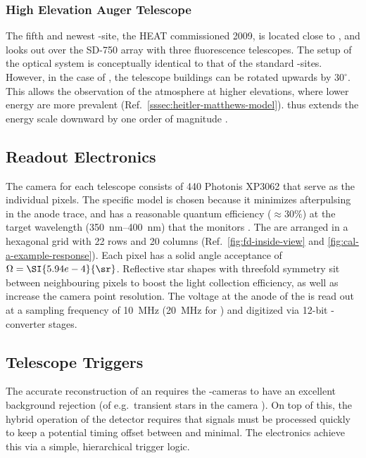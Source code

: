 \subsubsection{High Elevation Auger Telescope}
\label{sssec:HEAT}

The fifth and newest \FD-site, the \acl{HEAT} commissioned 2009, is located 
close to \CO, and looks out over the SD-750 array with three fluorescence 
telescopes. The setup of the optical system is conceptually identical to that
of the standard \FD-sites. However, in the case of \HEAT, the telescope 
buildings can be rotated upwards by $30^\circ$. This allows the observation of 
the atmosphere at higher elevations, where lower energy \EASs are more 
prevalent (Ref.\ \cref{sssec:heitler-matthews-model}). \HEAT thus extends the 
\FD energy scale downward by one order of magnitude 
\cite{mathesHEATTelescopesPierre2011}.

\subsection{Readout Electronics}
\label{ssec:fd-camera}

The camera for each telescope consists of 440 Photonis XP3062 \PMTs that serve 
as the individual pixels. The specific model is chosen because it minimizes 
afterpulsing in the anode trace, and has a reasonable quantum efficiency 
($\approx30\%$) at the target wavelength (\SIrange{350}{400}{\nano\meter}) that 
the \FD monitors \cite{xiaoCalibrationPhotonisXP30622005}. The \PMTs are 
arranged in a hexagonal grid with 22 rows and 20 columns (Ref.\ 
\cref{fig:fd-inside-view} and \cref{fig:cal-a-example-response}). Each pixel 
has a solid angle acceptance of $\Omega = \SI{5.94e-4}{\sr}$. Reflective star 
shapes with threefold symmetry sit between neighbouring pixels to boost the 
light collection efficiency, as well as increase the camera point resolution. 
The voltage at the anode of the \PMTs is read out at a sampling frequency of 
\SI{10}{\mega\hertz} (\SI{20}{\mega\hertz} for \HEAT) and digitized via 12-bit 
\ADC-converter stages. 

\subsection{Telescope Triggers}
\label{ssec:fd-triggers}

The accurate reconstruction of an \EAS requires the \FD-cameras to have an 
excellent background rejection (of e.g.\ transient stars in the camera \FOV). 
On top of this, the hybrid operation of the \FD detector requires that signals 
must be processed quickly to keep a potential timing offset between \FD and \SD
minimal. The \FD electronics achieve this via a simple, hierarchical trigger 
logic. 


